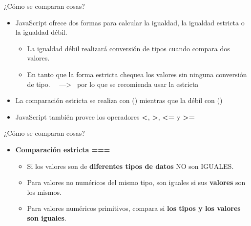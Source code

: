 \documentclass[aspectratio=43,10pt,t]{beamer}
\begin{document}
\begin{frame}{¿Cómo se comparan cosas?}\relax
\begingroup
{}
\begin{itemize}
  \item JavaScript ofrece dos formas para calcular la igualdad, la igualdad estricta o la igualdad débil. ~
  \begin{itemize}
    \item La igualdad débil \uline{realizará conversión de tipos} cuando compara dos valores.~
    \item En tanto que la forma estricta chequea los valores sin ninguna conversión de tipo. ~~---> ~por lo que se recomienda usar la estricta
  \end{itemize}
  \item La comparación estricta se realiza con \textbf{\red{===}} (\red{!==}) mientras que la débil con \textbf{\red{==}} (\red{!=})
  \item JavaScript también provee los operadores \textbf{<}, \textbf{>}, \textbf{<=} y \textbf{>=} 
\end{itemize}
\endgroup
{}
\end{frame}

\begin{frame}{¿Cómo se comparan cosas?}\relax
\begin{minipage}[t]{0.520\paperwidth}
\begingroup
{}
\begin{itemize}
  \item \textbf{Comparación estricta ===}
  \begin{itemize}
    \item Si los valores son de \textbf{diferentes tipos de datos} NO son IGUALES.
    \item Para valores no numéricos del mismo tipo, son iguales si sus \textbf{valores} son los mismos.
    \item Para valores numéricos primitivos, compara si \textbf{los tipos y los valores son iguales}.
  \end{itemize}
\end{itemize}
\endgroup
\end{minipage}
\end{frame}
\end{document}
